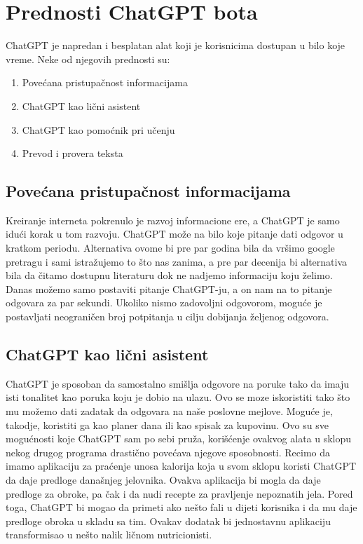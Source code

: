 \documentclass[fleqn, 12pt]{article}
\begin{document}
\newpage
\section{Prednosti ChatGPT bota}
ChatGPT je napredan i besplatan alat koji je korisnicima dostupan u bilo koje vreme. Neke od njegovih prednosti su:
\begin{enumerate}
  \item Povećana pristupačnost informacijama
  \item ChatGPT kao lični asistent
  \item ChatGPT kao pomoćnik pri učenju
  \item Prevod i provera teksta
\end{enumerate}

    \subsection{Povećana pristupačnost informacijama}
        \begin{text}
            Kreiranje interneta pokrenulo je razvoj informacione ere, a ChatGPT je samo idući korak u tom razvoju. ChatGPT može na bilo koje pitanje dati odgovor u kratkom periodu. Alternativa ovome bi pre par godina bila da vršimo google pretragu i sami istražujemo to što nas zanima, a pre par decenija bi alternativa bila da čitamo dostupnu literaturu dok ne nadjemo informaciju koju želimo. Danas možemo samo postaviti pitanje ChatGPT-ju, a on nam na to pitanje odgovara za par sekundi. Ukoliko nismo zadovoljni odgovorom, moguće je postavljati neograničen broj potpitanja u cilju dobijanja željenog odgovora.
        \end{text}
    \subsection{ChatGPT kao lični asistent}
        \begin{text}
            ChatGPT je sposoban da samostalno smišlja odgovore na poruke tako da imaju isti tonalitet kao poruka koju je dobio na ulazu. Ovo se moze iskoristiti tako što mu možemo dati zadatak da odgovara na naše poslovne mejlove. Moguće je, takodje, koristiti ga kao planer dana ili kao spisak za kupovinu. Ovo su sve mogućnosti koje ChatGPT sam po sebi pruža, korišćenje ovakvog alata u sklopu nekog drugog programa drastično povećava njegove sposobnosti.
            Recimo da imamo aplikaciju za praćenje unosa kalorija koja u svom sklopu koristi ChatGPT da daje predloge današnjeg jelovnika. Ovakva aplikacija bi mogla da daje predloge za obroke, pa čak i da nudi recepte za pravljenje nepoznatih jela. Pored toga, ChatGPT bi mogao da primeti ako nešto fali u dijeti korisnika i da mu daje predloge obroka u skladu sa tim. Ovakav dodatak bi jednostavnu aplikaciju transformisao u nešto nalik ličnom nutricionisti.
        \end{text}
\end{document}

